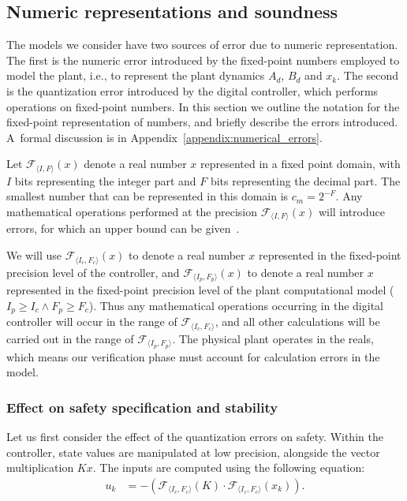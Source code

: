 \documentclass[runningheads,a4paper]{llncs}
\begin{document}
\subsection{Numeric representations and soundness} 
\label{sec:numeric_rep}


The models we consider have two sources of error due to numeric
representation.  The first is the numeric error introduced by the
fixed-point numbers employed to model the plant, i.e., to represent the
plant dynamics $A_d$, $B_d$ and $x_k$.  The second is the quantization error
introduced by the digital controller, which performs operations on
fixed-point numbers.  In this section we outline the notation for the
fixed-point representation of numbers, and briefly describe the errors
introduced.  A~formal discussion is in
Appendix~\ref{appendix:numerical_errors}.

Let $\mathcal{F}_{\langle I,F \rangle}(x)$ denote a real number $x$
represented in a fixed point domain, with $I$ bits representing the integer
part and $F$ bits representing the decimal part.  The smallest number that
can be represented in this domain is $c_m=2^{-F}$.  Any mathematical
operations performed at the precision $\mathcal{F}_{\langle I,F \rangle}(x)$
will introduce errors, for which an upper bound can be
given~\cite{DBLP:conf/arith/BrainTRW15}.

We will use $\mathcal{F}_{\langle I_c,F_c \rangle}(x)$ to denote a real
number $x$ represented in the fixed-point precision level of the controller,
and $\mathcal{F}_{\langle I_p,F_p \rangle}(x)$ to denote a real number $x$
represented in the fixed-point precision level of the plant computational
model ($I_p \geq I_c \wedge\allowbreak F_p \geq F_c$).  Thus any mathematical
operations occurring in the digital controller will occur in the range of
$\mathcal{F}_{\langle I_c,F_c \rangle}$, and all other calculations will be
carried out in the range of $\mathcal{F}_{\langle I_p,F_p \rangle}$.  The
physical plant operates in the reals, which means our verification phase
must account for calculation errors in the model.

\subsubsection{Effect on safety specification and stability}

Let us first consider the effect of the quantization errors on safety. 
Within the controller, state values are manipulated at low precision,
alongside the vector multiplication $Kx$.
%
The inputs are computed using the following equation: 
%
\begin{align*}
u_{k}&=-(\mathcal{F}_{\langle I_c,F_c \rangle}(K)\cdot\mathcal{F}_{\langle I_c,F_c \rangle}(x_{k})). 
\end{align*}
\end{document}

